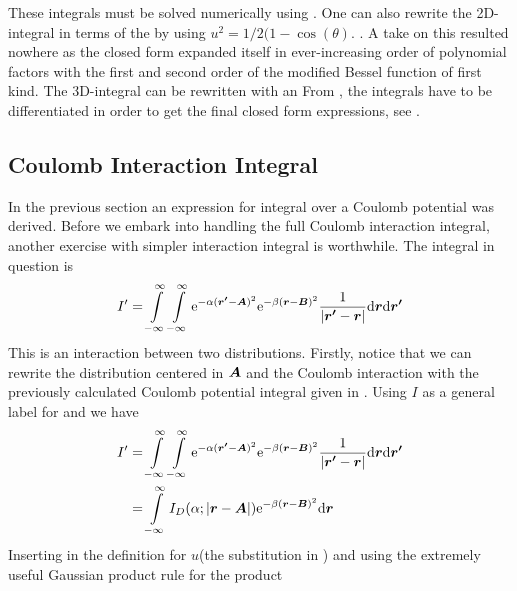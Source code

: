     These integrals must be solved numerically using \cite{gausschebyshev}. One can also rewrite the 2D-integral in
    terms of the  by using
    $u^2=1/2(1 - \cos(\theta)$\cite{modifiedBessel}.
    \cite{HelgakerTaylorGauss}. A take on this resulted nowhere as the closed
    form expanded itself in ever-increasing order of polynomial factors with
    the first and second order of the modified Bessel function of first kind.
    The 3D-integral can be rewritten with an 
    From , the integrals have to be differentiated in
    order to get the final closed form expressions, see .

\subsection{Coulomb Interaction Integral}
    In the previous section an expression for integral over a Coulomb potential
    was derived. Before we embark into handling the full Coulomb interaction
    integral, another exercise with simpler interaction integral is worthwhile.
    The integral in question is
        \begin{equation}
            I' = \int\limits^{\infty}_{-\infty}\int\limits^{\infty}_{-\infty} \mathrm{e}^{-\alpha(\boldsymbol{{r'}}-\boldsymbol{{A}})^2}
            \mathrm{e}^{-\beta(\boldsymbol{{r}}-\boldsymbol{{B}})^2} \frac{1}{\abs{\boldsymbol{{r'}} -
            \boldsymbol{{r}}}} \mathrm{d}\boldsymbol{{r}} \mathrm{d}\boldsymbol{{r'}}
            \label{eq:coulombInteractionSimple}
        \end{equation}
    This is an interaction between two distributions. Firstly, notice that we
    can rewrite the distribution centered in $\boldsymbol{{A}}$ and the Coulomb
    interaction with the previously calculated Coulomb potential integral given
    in . Using $I$ as a general label for
     and  we have
        \begin{align}
            I' &= \int\limits^{\infty}_{-\infty}\int\limits^{\infty}_{-\infty} \mathrm{e}^{-\alpha(\boldsymbol{{r'}}-\boldsymbol{{A}})^2}
            \mathrm{e}^{-\beta(\boldsymbol{{r}}-\boldsymbol{{B}})^2} \frac{1}{\abs{\boldsymbol{{r'}} -
            \boldsymbol{{r}}}} \mathrm{d}\boldsymbol{{r}} \mathrm{d}\boldsymbol{{r'}} \nonumber \\
            &= \int\limits^{\infty}_{-\infty} I_D(\alpha;\abs{\boldsymbol{{r}}-\boldsymbol{{A}}}) \mathrm{e}^{-\beta(\boldsymbol{{r}}
            - \boldsymbol{{B}})^2} \mathrm{d}\boldsymbol{{r}}
            \label{eq:Cintr1}
        \end{align}
    Inserting in the definition for $u$(the substitution in )
    and using the extremely useful Gaussian product rule for the product

